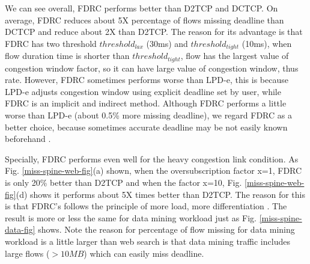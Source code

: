 \documentclass[10pt, conference, letterpaper]{IEEEtran}
\begin{document}
\begin{figure*}[!htb]
\centering
{}
\caption{Deadline miss comparison between FDRC, LPD-e, D2TCP and DCTCP under web search workload. Flows' deadline have uniform distribution between 10ms and 30ms }
\label{miss-spine-web-fig}
\end{figure*}

We can see overall, FDRC performs better than D2TCP and DCTCP.  On average, FDRC reduces about 5X  percentage of flows missing deadline than DCTCP and reduce about 2X 
than D2TCP. The reason for its advantage is that FDRC has two threshold $threshold_{lax}$ (30ms) and $threshold_{tight}$ (10ms), when flow duration time is shorter than
$threshold_{tight}$, flow has the largest value of congestion window factor, so it can have large value of congestion window, thus rate. However, FDRC sometimes performs worse than LPD-e, this is because 
LPD-e adjusts congestion window using explicit deadline set by user, while FDRC is an implicit and indirect method. Although FDRC performs a little worse than
LPD-e (about 0.5\% more missing deadline), we regard FDRC as a better choice, because sometimes accurate deadline may be not easily known beforehand .

Specially, FDRC performs even well for the heavy congestion link condition. As Fig. \ref{miss-spine-web-fig}(a) shown, when the oversubscription factor x=1, FDRC is only 20\% better than D2TCP and when the factor 
x=10, Fig. \ref{miss-spine-web-fig}(d) shows it performs about 5X times better than D2TCP. The reason for this is that FDRC's follows the principle of more load, more differentiation \cite{LPD}.
The result is more or less the same for data mining workload just as Fig. \ref{miss-spine-data-fig} shows.
Note the reason for percentage of flow missing for data mining workload is a little larger than web search is that data mining traffic includes large flows ($>10MB$) which can easily miss deadline.
\end{document}
